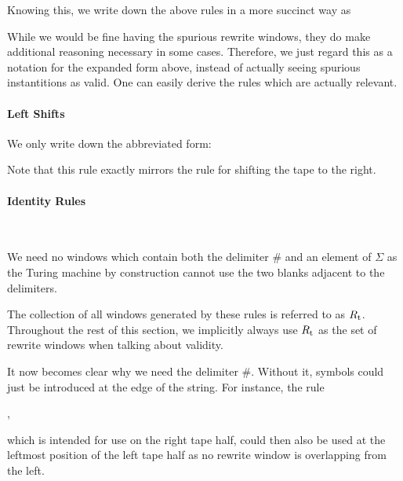 Knowing this, we write down the above rules in a more succinct way as 
\begin{center}
\end{center}
While we would be fine having the spurious rewrite windows, they do make additional reasoning necessary in some cases. Therefore, we just regard this as a notation for the expanded form above, instead of actually seeing spurious instantitions as valid. One can easily derive the rules which are actually relevant.

\paragraph{Left Shifts}
We only write down the abbreviated form:
\begin{center}
\end{center}
Note that this rule exactly mirrors the rule for shifting the tape to the right.
\paragraph{Identity Rules}
\begin{center}
  \\
  \trewwin{\#}{\blank}{\blank}{\#}{\blank}{\blank} 
  \quad \trewwin{\blank}{\blank}{\#}{\blank}{\blank}{\#}
\end{center}
We need no windows which contain both the delimiter $\#$ and an element of $\Sigma$ as the Turing machine by construction cannot use the two blanks adjacent to the delimiters.

The collection of all windows generated by these rules is referred to as $R_{\text{t}}$. 
Throughout the rest of this section, we implicitly always use $R_{\text{t}}$ as the set of rewrite windows when talking about validity.

\begin{remark}
  It now becomes clear why we need the delimiter $\#$. Without it, symbols could just be introduced at the edge of the string. For instance, the rule 
  \begin{center}
    ,
  \end{center}
  which is intended for use on the right tape half, could then also be used at the leftmost position of the left tape half as no rewrite window is overlapping from the left.
\end{remark}

